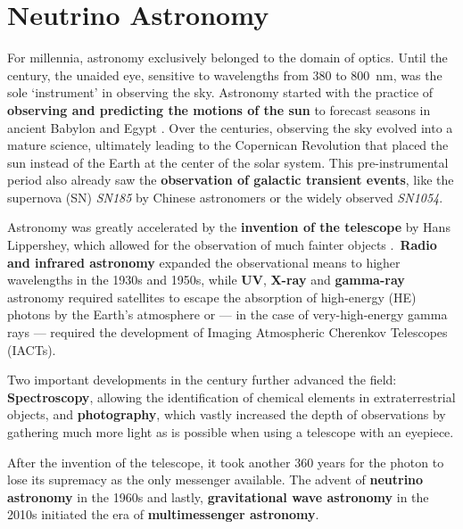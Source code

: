 \chapter{Neutrino Astronomy}\label{theory}

For millennia, astronomy exclusively belonged to the domain of optics. Until the  century, the unaided eye, sensitive to wavelengths from \num{380} to \SI{800}{\nano\m}, was the sole `instrument'  in observing the sky. Astronomy started with the practice of \textbf{observing and predicting the motions of the sun} to forecast seasons in ancient Babylon and Egypt . Over the centuries, observing the sky evolved into a mature science, ultimately leading to the Copernican Revolution that placed the sun instead of the Earth at the center of the solar system. This pre-instrumental period also already saw the \textbf{observation of galactic transient events}, like the supernova (SN) \emph{SN185} by Chinese astronomers or the widely observed \emph{SN1054}.

Astronomy was greatly accelerated by the \textbf{invention of the telescope} by Hans Lippershey, which allowed for the observation of much fainter objects .\ \textbf{Radio and infrared astronomy} expanded the observational means to higher wavelengths in the 1930s and 1950s, while \textbf{UV}, \textbf{X-ray} and \textbf{gamma-ray} astronomy required satellites to escape the absorption of high-energy (HE) photons by the Earth's atmosphere or --- in the case of very-high-energy gamma rays --- required the development of Imaging Atmospheric Cherenkov Telescopes (IACTs).

Two important developments in the  century further advanced the field: \textbf{Spectroscopy}, allowing the identification of chemical elements in extraterrestrial objects, and \textbf{photography}, which vastly increased the depth of observations by gathering much more light as is possible when using a telescope with an eyepiece.

After the invention of the telescope, it took another 360 years for the photon to lose its supremacy as the only messenger available. The advent of \textbf{neutrino astronomy} in the 1960s and lastly, \textbf{gravitational wave astronomy} in the 2010s initiated the era of \textbf{multimessenger astronomy}.

